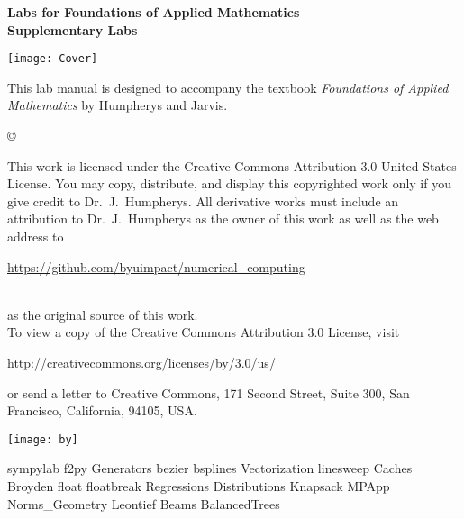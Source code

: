\documentclass[nociteref]{SIAM-GH-book}
\begin{document}



\thispagestyle{empty}
\begin{center}
 
{\huge \bf Labs for Foundations of Applied Mathematics} \\
\vspace{5mm}
{\Large \bf Supplementary Labs}
\vspace{20mm}

\texttt{[image: Cover]}
\end{center}
\frontmatter




\begin{thepreface}
This lab manual is designed to accompany the textbook \emph{Foundations of Applied Mathematics} by Humpherys and Jarvis.

\vfill
\copyright{This work is licensed under the Creative Commons Attribution 3.0 United States
License.  You may copy, distribute, and display this copyrighted work only if you give
credit to Dr.~J.~Humpherys. All derivative works must include an attribution to Dr.~J.~Humpherys as the owner of this work as well as the web address to
\\\centerline{\url{https://github.com/byuimpact/numerical_computing}}\\ as the original source of
this
work.\\To view a copy of the Creative Commons Attribution 3.0 License,
visit\\\centerline{\url{http://creativecommons.org/licenses/by/3.0/us/}} or send a letter to
Creative Commons, 171 Second Street, Suite 300, San Francisco, California, 94105, USA.}

\vfill
\centering\texttt{[image: by]}
\vfill
\end{thepreface}

\setcounter{tocdepth}{1}
\tableofcontents

\mainmatter
{sympylab}
{f2py}
{Generators}
{bezier}
{bsplines}
{Vectorization}
{linesweep}
{Caches}
{Broyden}
{float}
{floatbreak}
{Regressions}
{Distributions}
{Knapsack}
{MPApp}
{Norms_Geometry}
{Leontief}
{Beams}
{BalancedTrees}
\end{document}
